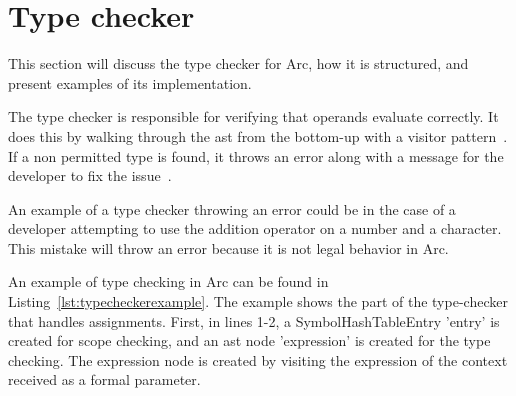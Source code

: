 \section{Type checker}\label{sec:typechecker}
This section will discuss the type checker for Arc, how it is structured, and present examples of its implementation.

The type checker is responsible for verifying that operands evaluate correctly. It does this by walking through the \gls{ast} from the bottom-up with a visitor pattern~\cite{Parr2014}. If a non permitted type is found, it throws an error along with a message for the developer to fix the issue~\cite{Sebesta2016}.

An example of a type checker throwing an error could be in the case of a developer attempting to use the addition operator on a number and a character. This mistake will throw an error because it is not legal behavior in Arc.




An example of type checking in Arc can be found in Listing~\ref{lst:typecheckerexample}. The example shows the part of the type-checker that handles assignments. First, in lines 1-2, a SymbolHashTableEntry 'entry' is created for scope checking, and an \gls{ast} node 'expression' is created for the type checking. The expression node is created by visiting the expression of the context received as a formal parameter.


